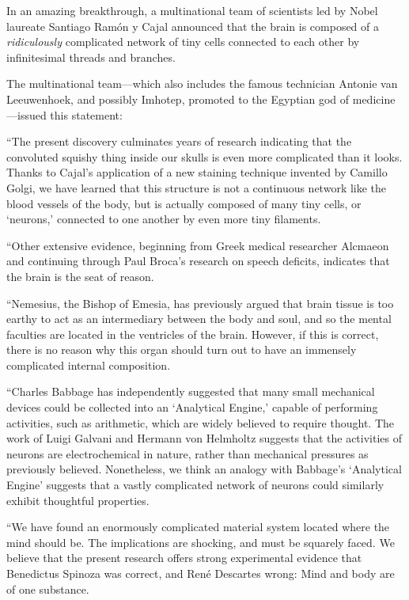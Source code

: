 \myendsectiontext


\bigskip


{
 In an amazing breakthrough, a multinational team of scientists led
by Nobel laureate Santiago Ramón y Cajal announced that the brain is
composed of a \textit{ridiculously} complicated network of tiny cells
connected to each other by infinitesimal threads and branches. }

{
 The multinational team---which also includes the famous technician
Antonie van Leeuwenhoek, and possibly Imhotep, promoted to the Egyptian
god of medicine---issued this statement:}

{
 ``The present discovery culminates years of
research indicating that the convoluted squishy thing inside our skulls
is even more complicated than it looks. Thanks to
Cajal's application of a new staining technique
invented by Camillo Golgi, we have learned that this structure is not a
continuous network like the blood vessels of the body, but is actually
composed of many tiny cells, or
`neurons,' connected to one another by
even more tiny filaments.}

{
 ``Other extensive evidence, beginning from Greek
medical researcher Alcmaeon and continuing through Paul
Broca's research on speech deficits, indicates that the
brain is the seat of reason.}

{
 ``Nemesius, the Bishop of Emesia, has previously
argued that brain tissue is too earthy to act as an intermediary
between the body and soul, and so the mental faculties are located in
the ventricles of the brain. However, if this is correct, there is no
reason why this organ should turn out to have an immensely complicated
internal composition.}

{
 ``Charles Babbage has independently suggested
that many small mechanical devices could be collected into an
`Analytical Engine,' capable of
performing activities, such as arithmetic, which are widely believed to
require thought. The work of Luigi Galvani and Hermann von Helmholtz
suggests that the activities of neurons are electrochemical in nature,
rather than mechanical pressures as previously believed. Nonetheless,
we think an analogy with Babbage's
`Analytical Engine' suggests that a
vastly complicated network of neurons could similarly exhibit
thoughtful properties.}

{
 ``We have found an enormously complicated
material system located where the mind should be. The implications are
shocking, and must be squarely faced. We believe that the present
research offers strong experimental evidence that Benedictus Spinoza
was correct, and René Descartes wrong: Mind and body are of one
substance.}

